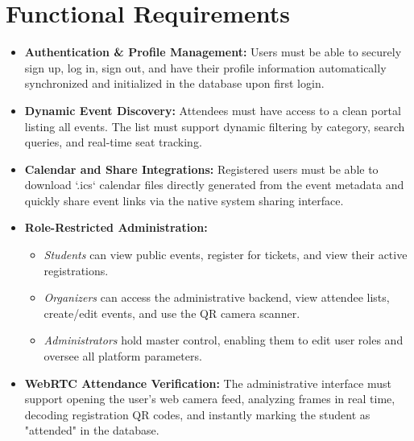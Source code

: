 \documentclass[14pt,a4paper]{extreport}
\begin{document}
\section{Functional Requirements}
\begin{itemize}
    \item \textbf{Authentication \& Profile Management:} Users must be able to securely sign up, log in, sign out, and have their profile information automatically synchronized and initialized in the database upon first login.
    \item \textbf{Dynamic Event Discovery:} Attendees must have access to a clean portal listing all events. The list must support dynamic filtering by category, search queries, and real-time seat tracking.
    \item \textbf{Calendar and Share Integrations:} Registered users must be able to download `.ics` calendar files directly generated from the event metadata and quickly share event links via the native system sharing interface.
    \item \textbf{Role-Restricted Administration:}
    \begin{itemize}
        \item \textit{Students} can view public events, register for tickets, and view their active registrations.
        \item \textit{Organizers} can access the administrative backend, view attendee lists, create/edit events, and use the QR camera scanner.
        \item \textit{Administrators} hold master control, enabling them to edit user roles and oversee all platform parameters.
    \end{itemize}
    \item \textbf{WebRTC Attendance Verification:} The administrative interface must support opening the user's web camera feed, analyzing frames in real time, decoding registration QR codes, and instantly marking the student as "attended" in the database.
\end{itemize}
\end{document}
